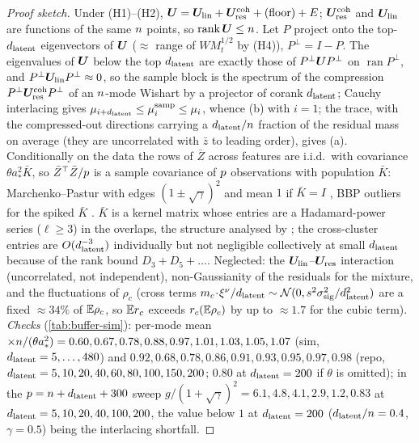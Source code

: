 \begin{proof}[Proof sketch]
Under (H1)--(H2), $\bm{U}=\bm{U}_{\rm lin}+\bm{U}^{\rm coh}_{\rm res}+(\text{floor})+E$; $\bm{U}^{\rm coh}_{\rm res}$ and $\bm{U}_{\rm lin}$ are functions of the same $n$ points, so $\operatorname{rank}\bm{U}\le n$. Let $P$ project onto the top-$d_{\mathrm{latent}}$ eigenvectors of $\bm{U}$ ($\approx$ range of $WM_t^{1/2}$ by (H4)), $P^\perp=I-P$. The eigenvalues of $\bm{U}$ below the top $d_{\mathrm{latent}}$ are exactly those of $P^\perp\bm{U} P^\perp$ on $\operatorname{ran}P^\perp$, and $P^\perp\bm{U}_{\rm lin}P^\perp\approx0$, so the sample block is the spectrum of the compression $P^\perp\bm{U}^{\rm coh}_{\rm res}P^\perp$ of an $n$-mode Wishart by a projector of corank $d_{\mathrm{latent}}$; Cauchy interlacing gives $\mu_{i+d_{\mathrm{latent}}}\le\mu^{\rm samp}_i\le\mu_i$, whence (b) with $i=1$; the trace, with the compressed-out directions carrying a $d_{\mathrm{latent}}/n$ fraction of the residual mass on average (they are uncorrelated with $\bar z$ to leading order), gives (a). Conditionally on the data the rows of $\bar Z$ across features are i.i.d.\ with covariance $\theta a_*^2\bar K$, so $\bar Z^\top\bar Z/p$ is a sample covariance of $p$ observations with population $\bar K$: Marchenko--Pastur with edges $(1\pm\sqrt\gamma)^2$ and mean $1$ if $\bar K=I$ \citep{couillet2011rmt}, BBP outliers for the spiked $\bar K$ \citep{baik2005phase}. $\bar K$ is a kernel matrix whose entries are a Hadamard-power series ($\ell\ge3$) in the overlaps, the structure analysed by \citet{ELKaroui2010spectrum}; the cross-cluster entries are $O(d_{\mathrm{latent}}^{-3})$ individually but not negligible collectively at small $d_{\mathrm{latent}}$ because of the rank bound $D_3+D_5+\dots$. Neglected: the $\bm{U}_{\rm lin}$--$\bm{U}_{\rm res}$ interaction (uncorrelated, not independent), non-Gaussianity of the residuals for the mixture, and the fluctuations of $\rho_c$ (cross terms $m_c\!\cdot\!\xi^\nu/d_{\mathrm{latent}}\sim\mathcal N(0,s^2\sigma_{\mathrm{sig}}^2/d_{\mathrm{latent}}^2)$ are a fixed $\approx34\%$ of $\mathbb{E}\rho_c$, so $\mathbb{E} r_c$ exceeds $r_c(\mathbb{E}\rho_c)$ by up to $\approx1.7$ for the cubic term). \emph{Checks} (\cref{tab:buffer-sim}): per-mode mean $\times n/(\theta a_*^2)=0.60,0.67,0.78,0.88,0.97,1.01,1.03,1.05,1.07$ (sim, $d_{\mathrm{latent}}=5,\dots,480$) and $0.92,0.68,0.78,0.86,0.91,0.93,0.95,0.97,0.98$ (repo, $d_{\mathrm{latent}}=5,10,20,40,60,80,100,150,200$; $0.80$ at $d_{\mathrm{latent}}=200$ if $\theta$ is omitted); in the $p=n+d_{\mathrm{latent}}+300$ sweep $g/(1+\sqrt\gamma)^2=6.1,4.8,4.1,2.9,1.2,0.83$ at $d_{\mathrm{latent}}=5,10,20,40,100,200$, the value below $1$ at $d_{\mathrm{latent}}=200$ ($d_{\mathrm{latent}}/n=0.4$, $\gamma=0.5$) being the interlacing shortfall.
\end{proof}

